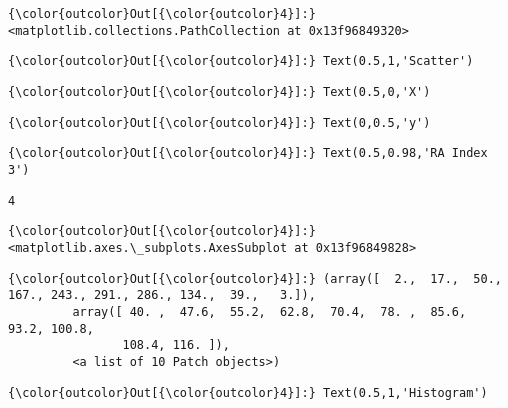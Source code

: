 \documentclass[11pt]{article}
\begin{document}
\begin{Verbatim}[commandchars=\\\{\}]
{\color{outcolor}Out[{\color{outcolor}4}]:} <matplotlib.collections.PathCollection at 0x13f96849320>
\end{Verbatim}
            
\begin{Verbatim}[commandchars=\\\{\}]
{\color{outcolor}Out[{\color{outcolor}4}]:} Text(0.5,1,'Scatter')
\end{Verbatim}
            
\begin{Verbatim}[commandchars=\\\{\}]
{\color{outcolor}Out[{\color{outcolor}4}]:} Text(0.5,0,'X')
\end{Verbatim}
            
\begin{Verbatim}[commandchars=\\\{\}]
{\color{outcolor}Out[{\color{outcolor}4}]:} Text(0,0.5,'y')
\end{Verbatim}
            
\begin{Verbatim}[commandchars=\\\{\}]
{\color{outcolor}Out[{\color{outcolor}4}]:} Text(0.5,0.98,'RA Index 3')
\end{Verbatim}
            
    \begin{Verbatim}[commandchars=\\\{\}]
4

    \end{Verbatim}

\begin{Verbatim}[commandchars=\\\{\}]
{\color{outcolor}Out[{\color{outcolor}4}]:} <matplotlib.axes.\_subplots.AxesSubplot at 0x13f96849828>
\end{Verbatim}
            
\begin{Verbatim}[commandchars=\\\{\}]
{\color{outcolor}Out[{\color{outcolor}4}]:} (array([  2.,  17.,  50., 167., 243., 291., 286., 134.,  39.,   3.]),
         array([ 40. ,  47.6,  55.2,  62.8,  70.4,  78. ,  85.6,  93.2, 100.8,
                108.4, 116. ]),
         <a list of 10 Patch objects>)
\end{Verbatim}
            
\begin{Verbatim}[commandchars=\\\{\}]
{\color{outcolor}Out[{\color{outcolor}4}]:} Text(0.5,1,'Histogram')
\end{Verbatim}
            
\end{document}
